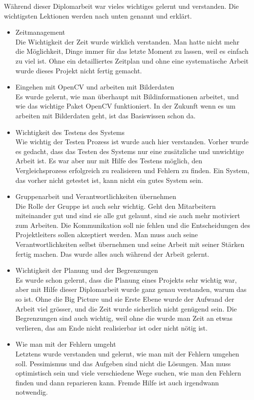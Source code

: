 Während dieser Diplomarbeit war vieles wichtiges gelernt und verstanden. Die wichtigsten Lektionen werden nach unten genannt und erklärt.\\
\begin{itemize}
	\item Zeitmanagement \\
	
	Die Wichtigkeit der Zeit wurde wirklich verstanden. Man hatte nicht mehr die Möglichkeit, Dinge immer für das letzte Moment zu lassen, weil es einfach zu viel ist. Ohne ein detailliertes Zeitplan und ohne eine systematische Arbeit wurde dieses Projekt nicht fertig gemacht.
	\item Eingehen mit OpenCV und arbeiten mit Bilderdaten\\
	
	Es wurde gelernt, wie man überhaupt mit Bildinformationen arbeitet, und wie das wichtige Paket OpenCV funktioniert. In der Zukunft wenn es um arbeiten mit Bilderdaten geht, ist das Basiswissen schon da.
	\item Wichtigkeit des Testens des Systems\\
	
	Wie wichtig der Testen Prozess ist wurde auch hier verstanden. Vorher wurde es gedacht, dass das Testen des Systems nur eine zusätzliche und unwichtige Arbeit ist. Es war aber nur mit Hilfe des Testens möglich, den Vergleichsprozess erfolgreich zu realisieren und Fehlern zu finden. Ein System, das vorher nicht getestet ist, kann nicht ein gutes System sein.
	
	\item Gruppenarbeit und Verantwortlichkeiten übernehmen \\
	
	Die Rolle der Gruppe ist auch sehr wichtig. Geht den Mitarbeitern miteinander gut und sind sie alle gut gelaunt, sind sie auch mehr motiviert zum Arbeiten. Die Kommunikation soll nie fehlen und die Entscheidungen des Projektleiters sollen akzeptiert werden. Man muss auch seine Verantwortlichkeiten selbst übernehmen und seine Arbeit mit seiner Stärken fertig machen. Das wurde alles auch während der Arbeit gelernt.
	
	\item Wichtigkeit der Planung und der Begrenzungen \\
	
	Es wurde schon gelernt, dass die Planung eines Projekts sehr wichtig war, aber mit Hilfe dieser Diplomarbeit wurde ganz genau verstanden, warum das so ist. Ohne die Big Picture und sie Erste Ebene wurde der Aufwand der Arbeit viel grösser, und die Zeit wurde sicherlich nicht genügend sein. Die Begrenzungen sind auch wichtig, weil ohne die wurde man Zeit an etwas verlieren, das am Ende nicht realisierbar ist oder nicht nötig ist.
	\item Wie man mit der Fehlern umgeht \\
	
	Letztens wurde verstanden und gelernt, wie man mit der Fehlern umgehen soll. Pessimismus und das Aufgeben sind nicht die Lösungen. Man muss optimistisch sein und viele verschiedene Wege suchen, wie man den Fehlern finden und dann reparieren kann. Fremde Hilfe ist auch irgendwann notwendig.
\end{itemize}	
